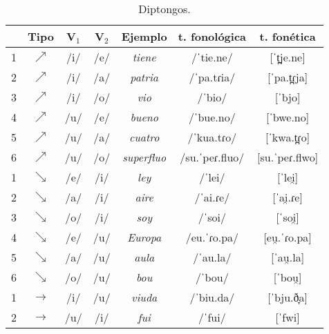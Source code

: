 \begin{table}[h!]
	\centering\small
	\begin{tabular}{rcccccc}
		\toprule
		& \textbf{Tipo} & \textbf{V$_1$} & \textbf{V$_2$} & \textbf{Ejemplo} & \textbf{t. fonológica} & \textbf{t. fonética} \\
		\midrule
		1& $\nearrow$ &/i/  &	/e/  &    \textit{tiene} &	/ˈtie.ne/  &	[ˈt̪je.ne]  \\
		2& $\nearrow$ &/i/  &	/a/  &   \textit{patria} &	/ˈpa.tɾia/  &	[ˈpa.t̪ɾja] \\
		3& $\nearrow$ &/i/  &	/o/   &       \textit{vio} &	/ˈbio/  &	[ˈbjo]  \\
		4& $\nearrow$ &/u/  &	/e/  &  \textit{bueno} &	/ˈbue.no/  &	[ˈbwe.no] \\
		5& $\nearrow$ &/u/  &	/a/  & \textit{cuatro} &	/ˈkua.tɾo/  &	[ˈkwa.t̪ɾo] \\
		6& $\nearrow$ &/u/  &	/o/  &       \textit{superfluo} &	/su.ˈpeɾ.fluo/  &	[su.ˈpeɾ.flwo] \\
		\midrule
		1& $\searrow$ &/e/  &	/i/  &       \textit{ley} &	/ˈlei/  &	[ˈlei̯] \\
		2& $\searrow$ &/a/  &	/i/   & \textit{aire}&	/ˈai.ɾe/  &	[ˈai̯.ɾe]  \\
		3& $\searrow$ &/o/  &	/i/  & \textit{soy}  &	/ˈsoi/  &	[ˈsoi̯]  \\
		4& $\searrow$ &/e/  &	/u/ &  \textit{Europa}  &	/eu.ˈɾo.pa/  &	[eu̯.ˈɾo.pa] \\
		5& $\searrow$ &/a/  &	/u/ & \textit{aula} &	/ˈau.la/  &	[ˈau̯.la]  \\
		6& $\searrow$ &/o/  &	/u/ & \textit{bou}  &	/ˈbou/ & 	[ˈbou̯]  \\
		\midrule
		1& $\longrightarrow$ &/i/  &	/u/ &    \textit{viuda} &	/ˈbiu.da/  &	[ˈbju.ð̞a]  \\
		2& $\longrightarrow$ &/u/  &	/i/  &    \textit{fui}  &	/ˈfui/ 	 & [ˈfwi]  \\
		\bottomrule
	\end{tabular}
	\caption{Diptongos.}
	\label{tab:diptongos
	}
\end{table}
